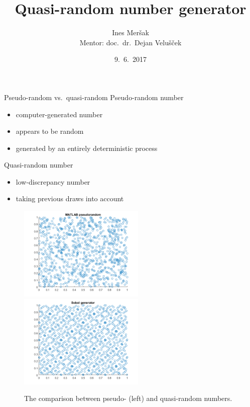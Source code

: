 \documentclass[11pt]{beamer}
\title{Quasi-random number generator}
\author[Ines Meršak]{Ines Meršak \\
    Mentor: doc.~dr.~Dejan Velušček}
\date{9.~6.~2017}
\begin{document}
\begin{frame}
    \maketitle
\end{frame}

\begin{frame}{Pseudo-random vs.~quasi-random}
    \alert{Pseudo-random number} 
    \begin{itemize}
        \item computer-generated number
        \item appears to be random
        \item generated by an entirely deterministic process
    \end{itemize}

    \bigskip
    
    \bigskip
    
    \alert{Quasi-random number}
    \begin{itemize}
        \item low-discrepancy number
        \item taking previous draws into account
    \end{itemize}
\end{frame}

\begin{frame}
    \begin{figure}
        \includegraphics[width=170pt]{matlab-pseudorandom-points.png}
        \includegraphics[width=170pt]{sobol-points.png}
    \caption{The comparison between pseudo- (left) and quasi-random numbers.}
    \end{figure}
\end{frame}
\end{document}
